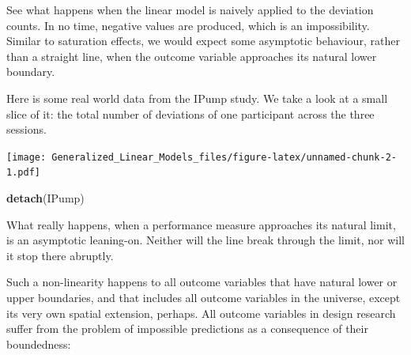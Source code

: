 \documentclass[]{svmono}
\newenvironment{Shaded}{\begin{snugshade}}{\end{snugshade}}
\newcommand{\KeywordTok}[1]{\textcolor[rgb]{0.13,0.29,0.53}{\textbf{#1}}}
\newcommand{\DataTypeTok}[1]{\textcolor[rgb]{0.13,0.29,0.53}{#1}}
\newcommand{\DecValTok}[1]{\textcolor[rgb]{0.00,0.00,0.81}{#1}}
\newcommand{\StringTok}[1]{\textcolor[rgb]{0.31,0.60,0.02}{#1}}
\newcommand{\OperatorTok}[1]{\textcolor[rgb]{0.81,0.36,0.00}{\textbf{#1}}}
\newcommand{\NormalTok}[1]{#1}
\theoremstyle{definition}
\theoremstyle{definition}
\theoremstyle{definition}
\theoremstyle{remark}
\begin{document}
See what happens when the linear model is naively applied to the
deviation counts. In no time, negative values are produced, which is an
impossibility. Similar to saturation effects, we would expect some
asymptotic behaviour, rather than a straight line, when the outcome
variable approaches its natural lower boundary.

Here is some real world data from the IPump study. We take a look at a
small slice of it: the total number of deviations of one participant
across the three sessions.

\begin{Shaded}
\end{Shaded}

\texttt{[image: Generalized\_Linear\_Models\_files/figure-latex/unnamed-chunk-2-1.pdf]}

\begin{Shaded}
\begin{Highlighting}[]
\KeywordTok{detach}\NormalTok{(IPump)}
\end{Highlighting}
\end{Shaded}

What really happens, when a performance measure approaches its natural
limit, is an asymptotic leaning-on. Neither will the line break through
the limit, nor will it stop there abruptly.

Such a non-linearity happens to all outcome variables that have natural
lower or upper boundaries, and that includes all outcome variables in
the universe, except its very own spatial extension, perhaps. All
outcome variables in design research suffer from the problem of
impossible predictions as a consequence of their boundedness:
\end{document}
